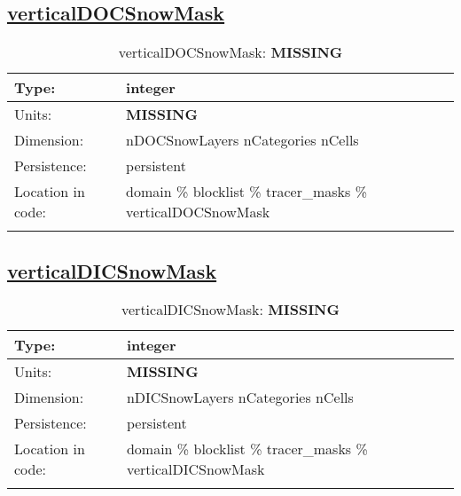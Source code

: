 \subsection[verticalDOCSnowMask]{\hyperref[sec:var_tab_tracer_masks]{verticalDOCSnowMask}}
\label{subsec:var_sec_tracer_masks_verticalDOCSnowMask}
\begin{center}
\begin{longtable}{| p{2.0in} | p{4.0in} |}
        \hline 
        Type: & integer \\
        \hline 
        Units: & {\bf \color{red} MISSING} \\
        \hline 
        Dimension: & nDOCSnowLayers nCategories nCells \\
        \hline 
        Persistence: & persistent \\
        \hline 
         Location in code: & domain \% blocklist \% tracer\_masks \% verticalDOCSnowMask \\
         \hline 
    \caption{verticalDOCSnowMask: {\bf \color{red} MISSING}}
\end{longtable}
\end{center}
\subsection[verticalDICSnowMask]{\hyperref[sec:var_tab_tracer_masks]{verticalDICSnowMask}}
\label{subsec:var_sec_tracer_masks_verticalDICSnowMask}
\begin{center}
\begin{longtable}{| p{2.0in} | p{4.0in} |}
        \hline 
        Type: & integer \\
        \hline 
        Units: & {\bf \color{red} MISSING} \\
        \hline 
        Dimension: & nDICSnowLayers nCategories nCells \\
        \hline 
        Persistence: & persistent \\
        \hline 
         Location in code: & domain \% blocklist \% tracer\_masks \% verticalDICSnowMask \\
         \hline 
    \caption{verticalDICSnowMask: {\bf \color{red} MISSING}}
\end{longtable}
\end{center}

